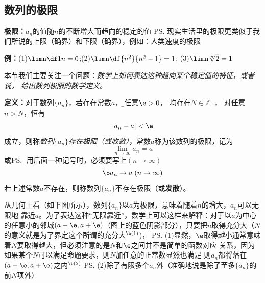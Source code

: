 \subsection{数列的极限}

{\bf 极限：}$a_n$的值随$n$的不断增大而趋向的稳定的值
\ps{现实生活里的极限更类似于我们所说的上限（确界）和下限（确界），例如：人类速度的极限} 

{\bf 例：}(1)$\limn\df1n=0$;\quad(2)$\limn\df{n^2}{n^2-1}=1$;
\quad(3)$\limn\sqrt[n]2=1$

\bigskip

本节我们主要关注一个问题：{\it 数学上如何表达这种趋向某个稳定值的特征，或者说，
给出数列极限的数学定义。}

{\bf 定义：}对于数列$\{a_n\}$，若存在常数$a$，{\b 对任意$\e>0$，
均存在$N\in\mathbb{Z}_+$，
对任意$n>N$，恒有
$$|a_n-a|<\e$$
成立}，则称{\it 数列$\{a_n\}$存在极限（或收敛）}，常数$a$称为该数列的极限，记为
$$\lim_{n\to\infty}a_n=a$$
或\ps{\b 使用后面一种记号时，必须要写上$(n\to\infty)$}
$${\b a_n\to a\;(n\to\infty)}$$
若上述常数$a$不存在，则称数列$\{a_n\}$不存在极限（或{\bf 发散}）。

从几何上看（如下图所示），数列$\{a_n\}$以$a$为极限，意味着随着$n$的增大，$a_n$可以无限地
靠近$a$。为了表达这种“无限靠近”，数学上可以这样来解释：对于以$a$为中心的任意小的邻域$(a-\e,
a+\e)$（图上的蓝色阴影部分），只要把$n$取得充分大（$N$的意义就是为了界定这个所谓的充分大$^{\b (1)}$)，
\ps{\b (1)显然，$\e$取得越小通常意味着$N$要取得越大，但必须注意的是$N$和$\e$之间并不是简单的函数对应
关系，因为如果某个$N$可以满足命题要求，则$N$加任意的正常数显然也满足}
则$a_n$都将落在$(a-\e,a+\e)$之内$^{\b (2)}$
\ps{\b (2)除了有限多个$a_n$外（准确地说是除了至多$\{a_n\}$的前$N$项外）}

